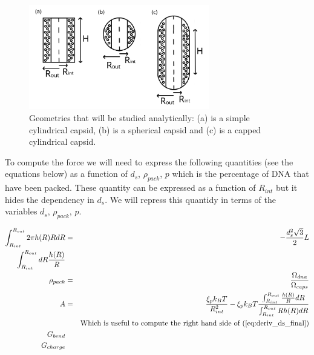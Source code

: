 \documentclass{article}
\begin{document}
\begin{figure}[H]
    \centering
    \includegraphics[width=0.7\textwidth]{analitical_geometries.png}
    \caption{Geometries that will be studied analytically: (a) is a simple cylindrical capsid, (b) is a spherical capsid and (c) is a capped cylindrical capsid.}
    \label{fig:shapes}
\end{figure}

To compute the force we will need to express the following quantities (see the equations below) as a function of $d_s$, $\rho_{pack}$, $ p $ which is the percentage of DNA that have been packed. These quantity can be expressed as a function of $R_{int}$ but it hides the dependency in $d_s$. We will repress this quantidy in terms of the variables $d_s$, $\rho_{pack}$, $ p $.

\begin{eqnarray}
    \int_{R_{int}}^{R_{out}} 2 \pi h(R)RdR &=& - \frac{d_s^2 \sqrt{3}}{2}L \\
    \int_{R_{int}}^{R_{out}} dR \frac{h(R)}{R} & & \\
    \rho_{pack} &=& \frac{\Omega_{dna}}{\Omega_{caps}} \\
    A &=& \frac{\xi_p k_B T}{R_{int}^2} - \xi_p k_B T \frac{\int_{R_{int}}^{R_{out}} \frac{h(R)}{R} dR}{\int_{R_{int}}^{R_{out}} R h(R) dR} \\
    & & \text{Which is useful to compute the right hand side of (\ref{eq:deriv_ds_final}}) \\
    G_{bend} & & \\
    G_{charge} & &
\end{eqnarray}
\end{document}
